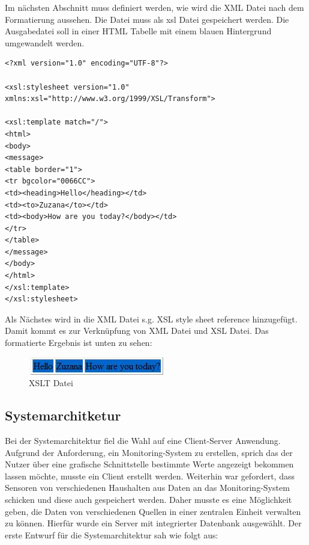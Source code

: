 Im nächsten Abschnitt muss definiert werden, wie wird die XML Datei nach dem Formatierung aussehen. Die Datei muss als xsl Datei gespeichert werden. Die Ausgabedatei soll in einer HTML Tabelle mit einem blauen Hintergrund umgewandelt werden.

\begin{lstlisting}
<?xml version="1.0" encoding="UTF-8"?>

<xsl:stylesheet version="1.0"
xmlns:xsl="http://www.w3.org/1999/XSL/Transform">

<xsl:template match="/">
<html>
<body>
<message>
<table border="1">
<tr bgcolor="0066CC">
<td><heading>Hello</heading></td>
<td><to>Zuzana</to></td>
<td><body>How are you today?</body></td>
</tr> 
</table>
</message> 
</body>
</html> 
</xsl:template>
</xsl:stylesheet>  
\end{lstlisting}
Als Nächstes wird in die XML Datei s.g. XSL style sheet reference hinzugefügt. Damit kommt es zur Verknüpfung von XML Datei und XSL Datei. Das formatierte Ergebnis ist unten zu sehen:
\begin{figure}[h]
	\begin{center}
		\includegraphics[scale=0.7]{images/xslt.jpg} 
		\caption{XSLT Datei}
		\label{fig:XSLTDatei}
	\end{center}
\end{figure}


\subsection{Systemarchitketur}
\label{subsec:Systemarchitketur}
Bei der Systemarchitektur fiel die Wahl auf eine Client-Server Anwendung. Aufgrund der Anforderung, ein Monitoring-System zu erstellen, sprich das der Nutzer über eine grafische Schnittstelle bestimmte Werte angezeigt bekommen lassen möchte, musste ein Client erstellt werden. Weiterhin war gefordert, dass Sensoren von verschiedenen Haushalten aus Daten an das Monitoring-System schicken und diese auch gespeichert werden. Daher musste es eine Möglichkeit geben, die Daten von verschiedenen Quellen in einer zentralen Einheit verwalten zu können. Hierfür wurde ein Server mit integrierter Datenbank ausgewählt. Der erste Entwurf für die Systemarchitektur sah wie folgt aus:


